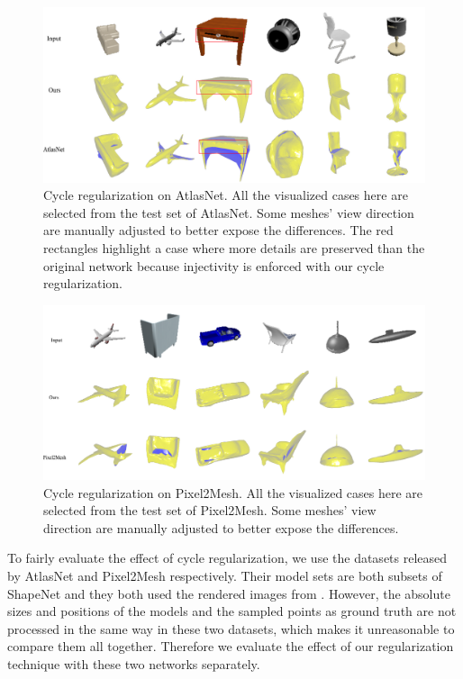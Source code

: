 \begin{figure}[t]
	\centering
	\includegraphics[width=\linewidth]{img/atlas/svr}
	\caption{Cycle regularization on AtlasNet. All the visualized cases here are selected from the test set of AtlasNet. Some meshes' view direction are manually adjusted to better expose the differences. The red rectangles highlight a case where more details are preserved than the original network because injectivity is enforced with our cycle regularization.}
	\label{fig:svr}
\end{figure}
\begin{figure}[t]
	\centering
	\includegraphics[width=\linewidth]{img/p2m/final}
	\caption{Cycle regularization on Pixel2Mesh. All the visualized cases here are selected from the test set of Pixel2Mesh. Some meshes' view direction are manually adjusted to better expose the differences.}
	\label{fig:p2m}
\end{figure}
 To fairly evaluate the effect of cycle regularization, we use the datasets released by AtlasNet and Pixel2Mesh respectively. Their model sets are both subsets of ShapeNet \cite{shapenetdata} and they both used the rendered images from \cite{3DR2N2}. However, the absolute sizes and positions of the models and the sampled points as ground truth are not processed in the same way in these two datasets, which makes it unreasonable to compare them all together. Therefore we evaluate the effect of our regularization technique with these two networks separately.

